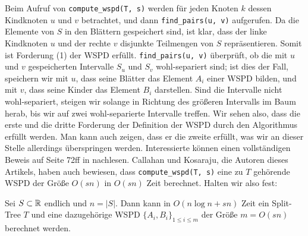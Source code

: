Beim Aufruf von \texttt{compute\_wspd(T, s)} werden für jeden Knoten $k$ dessen Kindknoten $u$ und $v$ betrachtet, und dann \texttt{find\_pairs(u, v)} aufgerufen. 
Da die Elemente von $S$ in den Blättern gespeichert sind, ist klar, dass der linke Kindknoten $u$ und der rechte $v$ disjunkte Teilmengen von $S$ repräsentieren. 
Somit ist Forderung (1) der WSPD erfüllt. \texttt{find\_pairs(u, v)} überprüft, ob die mit $u$ und $v$ gespeicherten Intervalle $S_u$ und $S_v$ wohl-separiert sind; ist dies der Fall, speichern wir mit $u$, dass seine Blätter das Element $A_i$ einer WSPD bilden, und mit $v$, dass seine Kinder das Element $B_i$ darstellen. 
Sind die Intervalle nicht wohl-separiert, steigen wir solange in Richtung des größeren Intervalls im Baum herab, bis wir auf zwei wohl-separierte Intervalle treffen. 
Wir sehen also, dass die erste und die dritte Forderung der Definition der WSPD durch den Algorithmus erfüllt werden. 
Man kann auch zeigen, dass er die zweite erfüllt, was wir an dieser Stelle allerdings überspringen werden. 
Interessierte können einen vollständigen Beweis auf Seite 72ff in \cite{callahan} nachlesen. Callahan und Kosaraju, die Autoren dieses Artikels, haben auch bewiesen, dass \texttt{compute\_wspd(T, s)} eine zu $T$ gehörende WSPD der Größe $O(sn)$ in $O(sn)$ Zeit berechnet. 
Halten wir also fest:
\begin{theorem}
	\label{theo:wspdtime}
	Sei $S \subset \mathbb{R}$ endlich und $n = |S|$. Dann kann in $O(n \log n + sn)$ Zeit ein Split-Tree $T$ und eine dazugehörige WSPD $\{A_i, B_i\}_{1 \leq i \leq m}$ der Größe $m = O(sn)$ berechnet werden.
\end{theorem}